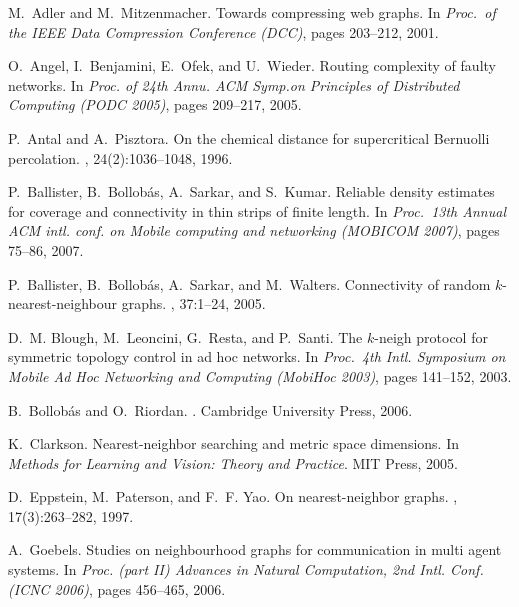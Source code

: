 \documentclass[11pt]{article}
\begin{document}

\begin{thebibliography}{10}

M.~Adler and M.~Mitzenmacher.
\newblock Towards compressing web graphs.
\newblock In {\em Proc.\ of the IEEE Data Compression Conference (DCC)}, pages
  203--212, 2001.

O.~Angel, I.~Benjamini, E.~Ofek, and U.~Wieder.
\newblock Routing complexity of faulty networks.
\newblock In {\em Proc. of 24th Annu. ACM Symp.on Principles of Distributed
  Computing (PODC 2005)}, pages 209--217, 2005.

P.~Antal and A.~Pisztora.
\newblock On the chemical distance for supercritical {Bernuolli} percolation.
, 24(2):1036--1048, 1996.

P.~Ballister, B.~Bollob\'as, A.~Sarkar, and S.~Kumar.
\newblock Reliable density estimates for coverage and connectivity in thin
  strips of finite length.
\newblock In {\em Proc.~13th Annual ACM intl. conf. on Mobile computing and
  networking (MOBICOM 2007)}, pages 75--86, 2007.

P.~Ballister, B.~Bollob\'as, A.~Sarkar, and M.~Walters.
\newblock Connectivity of random $k$-nearest-neighbour graphs.
, 37:1--24, 2005.

D.~M. Blough, M.~Leoncini, G.~Resta, and P.~Santi.
\newblock The $k$-neigh protocol for symmetric topology control in ad hoc
  networks.
\newblock In {\em Proc.~4th Intl. Symposium on Mobile Ad Hoc Networking and
  Computing (MobiHoc 2003)}, pages 141--152, 2003.

B.~Bollob\'as and O.~Riordan.
.
\newblock Cambridge University Press, 2006.

K.~Clarkson.
\newblock Nearest-neighbor searching and metric space dimensions.
\newblock In {\em Methods for Learning and Vision: Theory and Practice}. MIT
  Press, 2005.

D.~Eppstein, M.~Paterson, and F.~F. Yao.
\newblock On nearest-neighbor graphs.
, 17(3):263--282, 1997.

A.~Goebels.
\newblock Studies on neighbourhood graphs for communication in multi agent
  systems.
\newblock In {\em Proc. (part II) Advances in Natural Computation, 2nd Intl.
  Conf. (ICNC 2006)}, pages 456--465, 2006.


\end{thebibliography}
\end{document}
